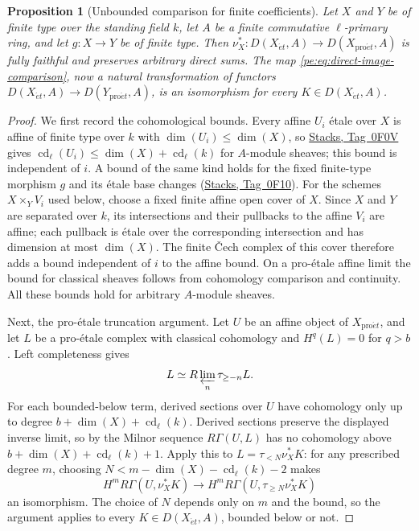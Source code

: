 \documentclass[11pt,a4paper]{article}
\numberwithin{equation}{section}
\newtheorem{proposition}[theorem]{Proposition}
\theoremstyle{definition}
\theoremstyle{remark}
\newcommand{\et}{\acute{e}t}
\newcommand{\proet}{\mathrm{pro}\acute{e}t}
\newcommand{\stacks}[1]{\href{https://stacks.math.columbia.edu/tag/#1}{\textnormal{Stacks, Tag~#1}}}
\begin{document}
\begin{proposition}[Unbounded comparison for finite coefficients]
\label{pe:unbounded-classical}
Let $X$ and $Y$ be of finite type over the standing field $k$, let
$A$ be a finite commutative $\ell$-primary ring, and let
$g:X\to Y$ be of finite type. Then
$\nu_X^*\colon D(X_{\et},A)\to D(X_{\proet},A)$ is fully faithful and
preserves arbitrary direct sums. The map
\eqref{pe:eq:direct-image-comparison}, now a natural transformation of
functors $D(X_{\et},A)\to D(Y_{\proet},A)$, is an isomorphism for every
$K\in D(X_{\et},A)$.
\end{proposition}
\begin{proof}
We first record the cohomological bounds. Every affine $U_i$ \'etale
over $X$ is affine of finite type over $k$ with
$\dim(U_i)\leq\dim(X)$, so \stacks{0F0V} gives
$\operatorname{cd}_\ell(U_i)\leq\dim(X)+\operatorname{cd}_\ell(k)$ for
$A$-module sheaves; this bound is independent of $i$. A bound of the
same kind holds for the fixed finite-type morphism $g$ and its
\'etale base changes (\stacks{0F10}). For the schemes $X\times_YV_i$
used below, choose a fixed finite affine open cover of $X$. Since
$X$ and $Y$ are separated over $k$, its intersections and their
pullbacks to the affine $V_i$ are affine; each pullback is \'etale
over the corresponding intersection and has dimension at most
$\dim(X)$. The finite \v{C}ech complex of this cover therefore adds a
bound independent of $i$ to the affine bound. On a pro-\'etale affine
limit the bound for classical sheaves follows from cohomology
comparison and continuity. All these bounds hold for arbitrary
$A$-module sheaves.

Next, the pro-\'etale truncation argument. Let $U$ be an affine object
of $X_{\proet}$, and let $L$ be a pro-\'etale complex with classical
cohomology and $H^q(L)=0$ for $q>b$. Left completeness gives
\[
 L\simeq R\varprojlim_n\tau_{\geq-n}L.
\]
For each bounded-below term, derived sections over $U$ have cohomology
only up to degree $b+\dim(X)+\operatorname{cd}_\ell(k)$. Derived sections
preserve the displayed inverse limit, so by the Milnor sequence
$R\Gamma(U,L)$ has no cohomology above $b+\dim(X)+\operatorname{cd}_\ell(k)+1$.
Apply this to $L=\tau_{<N}\nu_X^*K$: for any prescribed degree $m$,
choosing $N<m-\dim(X)-\operatorname{cd}_\ell(k)-2$ makes
\[
 H^mR\Gamma(U,\nu_X^*K)\longrightarrow
 H^mR\Gamma(U,\tau_{\geq N}\nu_X^*K)
\]
an isomorphism. The choice of $N$ depends only on $m$ and the bound,
so the argument applies to every $K\in D(X_{\et},A)$, bounded below or
not.


\end{proof}
\end{document}
